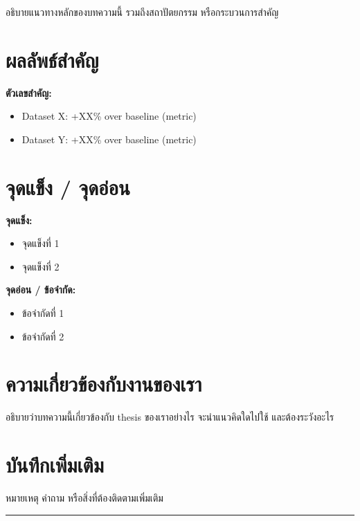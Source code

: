 \documentclass[10pt,a4paper]{article}
\begin{document}
อธิบายแนวทางหลักของบทความนี้ รวมถึงสถาปัตยกรรม
หรือกระบวนการสำคัญ

\section*{ผลลัพธ์สำคัญ}

\begin{highlight}
\textbf{ตัวเลขสำคัญ:}
\begin{itemize}[nosep]
  \item Dataset X: +XX\% over baseline (metric)
  \item Dataset Y: +XX\% over baseline (metric)
\end{itemize}
\end{highlight}

\section*{จุดแข็ง / จุดอ่อน}

\noindent\textbf{จุดแข็ง:}
\begin{itemize}[nosep, leftmargin=2em]
  \item จุดแข็งที่ 1
  \item จุดแข็งที่ 2
\end{itemize}

\vspace{6pt}
\noindent\textbf{จุดอ่อน / ข้อจำกัด:}
\begin{itemize}[nosep, leftmargin=2em]
  \item ข้อจำกัดที่ 1
  \item ข้อจำกัดที่ 2
\end{itemize}

\section*{ความเกี่ยวข้องกับงานของเรา}

อธิบายว่าบทความนี้เกี่ยวข้องกับ thesis ของเราอย่างไร
จะนำแนวคิดใดไปใช้ และต้องระวังอะไร

\section*{บันทึกเพิ่มเติม}

หมายเหตุ คำถาม หรือสิ่งที่ต้องติดตามเพิ่มเติม

\vspace{16pt}
\noindent\rule{\textwidth}{1pt}
\end{document}
